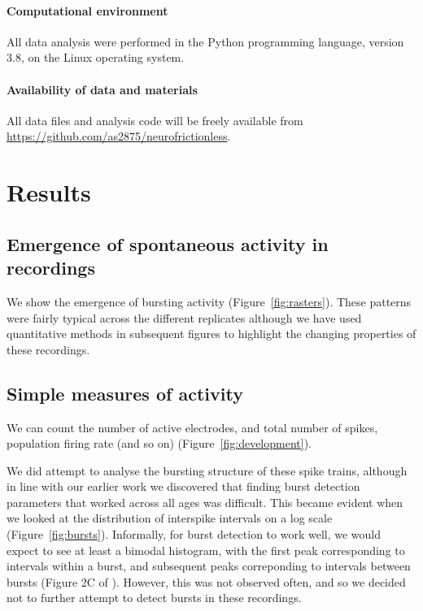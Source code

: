 \documentclass[doublespacing]{bmcart}
\begin{document}
\paragraph{Computational environment} All data analysis were performed
in the Python programming language, version 3.8, on the Linux operating system.

\paragraph{Availability of data and materials}

All data files and analysis code will be freely available from
\url{https://github.com/as2875/neurofrictionless}.

\section*{Results}

\subsection*{Emergence of spontaneous activity in recordings}
We show the emergence of bursting activity (Figure~\ref{fig:rasters}).  These patterns were fairly typical across the different replicates although we have used quantitative methods in subsequent figures to highlight the changing properties of these recordings.

\subsection*{Simple measures of activity}
We can count the number of active electrodes, and total number of
spikes, population firing rate (and so on)
(Figure~\ref{fig:development}).

We did attempt to analyse the bursting structure of these spike
trains, although in line with our earlier work \cite{Cotterill2016-qi}
we discovered that finding burst detection parameters that worked across
all ages was difficult.  This became evident when we looked at the
distribution of interspike intervals on a log scale
(Figure~\ref{fig:bursts}).  Informally, for burst detection to work
well, we would expect to see at least a bimodal histogram, with the
first peak corresponding to intervals within a burst, and subsequent
peaks correponding to intervals between bursts (Figure 2C of
\cite{Charlesworth2015-gv}).  However, this was not observed often,
and so we decided not to further attempt to detect bursts in these
recordings.
\end{document}
